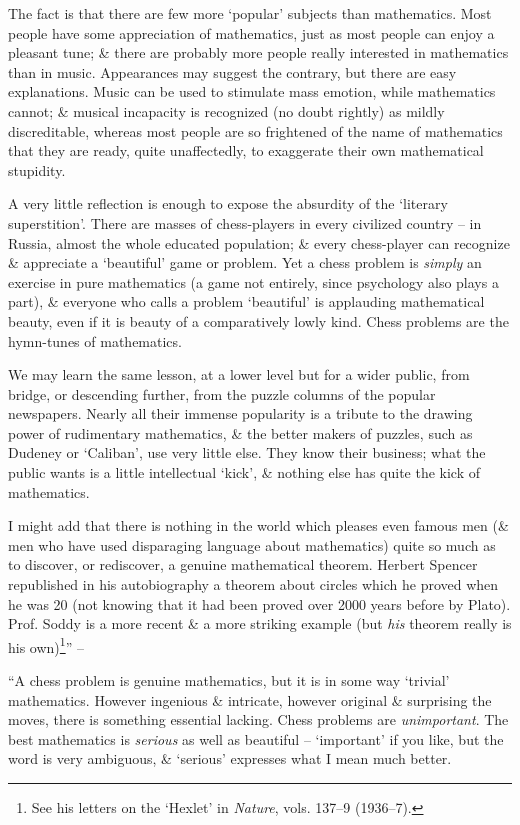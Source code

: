 \documentclass{article}
\numberwithin{equation}{section}
\begin{document}
The fact is that there are few more `popular' subjects than mathematics. Most people have some appreciation of mathematics, just as most people can enjoy a pleasant tune; \& there are probably more people really interested in mathematics than in music. Appearances may suggest the contrary, but there are easy explanations. Music can be used to stimulate mass emotion, while mathematics cannot; \& musical incapacity is recognized (no doubt rightly) as mildly discreditable, whereas most people are so frightened of the name of mathematics that they are ready, quite unaffectedly, to exaggerate their own mathematical stupidity.

A very little reflection is enough to expose the absurdity of the `literary superstition'. There are masses of chess-players in every civilized country -- in Russia, almost the whole educated population; \& every chess-player can recognize \& appreciate a `beautiful' game or problem. Yet a chess problem is \textit{simply} an exercise in pure mathematics (a game not entirely, since psychology also plays a part), \& everyone who calls a problem `beautiful' is applauding mathematical beauty, even if it is beauty of a comparatively lowly kind. Chess problems are the hymn-tunes of mathematics.

We may learn the same lesson, at a lower level but for a wider public, from bridge, or descending further, from the puzzle columns of the popular newspapers. Nearly all their immense popularity is a tribute to the drawing power of rudimentary mathematics, \& the better makers of puzzles, such as Dudeney or `Caliban', use very little else. They know their business; what the public wants is a little intellectual `kick', \& nothing else has quite the kick of mathematics.

I might add that there is nothing in the world which pleases even famous men (\& men who have used disparaging language about mathematics) quite so much as to discover, or rediscover, a genuine mathematical theorem. Herbert Spencer republished in his autobiography a theorem about circles which he proved when he was 20 (not knowing that it had been proved over 2000 years before by Plato). Prof. Soddy is a more recent \& a more striking example (but \textit{his} theorem really is his own)\footnote{See his letters on the `Hexlet' in \textit{Nature}, vols. 137--9 (1936--7).}'' -- \cite[pp. 84--88]{Hardy1992}

 ``A chess problem is genuine mathematics, but it is in some way `trivial' mathematics. However ingenious \& intricate, however original \& surprising the moves, there is something essential lacking. Chess problems are \textit{unimportant}. The best mathematics is \textit{serious} as well as beautiful -- `important' if you like, but the word is very ambiguous, \& `serious' expresses what I mean much better.
\end{document}
